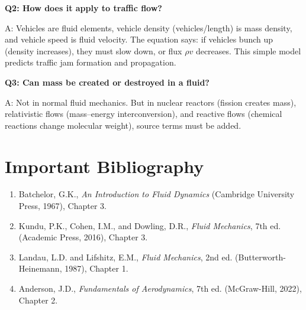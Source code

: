 \textbf{Q2: How does it apply to traffic flow?}

A: Vehicles are fluid elements, vehicle density (vehicles/length) is mass density, and vehicle speed is fluid velocity. The equation says: if vehicles bunch up (density increases), they must slow down, or flux $\rho v$ decreases. This simple model predicts traffic jam formation and propagation.

\textbf{Q3: Can mass be created or destroyed in a fluid?}

A: Not in normal fluid mechanics. But in nuclear reactors (fission creates mass), relativistic flows (mass--energy interconversion), and reactive flows (chemical reactions change molecular weight), source terms must be added.
\section*{Important Bibliography}

\begin{enumerate}
\item Batchelor, G.K., \textit{An Introduction to Fluid Dynamics} (Cambridge University Press, 1967), Chapter 3.
\item Kundu, P.K., Cohen, I.M., and Dowling, D.R., \textit{Fluid Mechanics}, 7th ed. (Academic Press, 2016), Chapter 3.
\item Landau, L.D. and Lifshitz, E.M., \textit{Fluid Mechanics}, 2nd ed. (Butterworth-Heinemann, 1987), Chapter 1.
\item Anderson, J.D., \textit{Fundamentals of Aerodynamics}, 7th ed. (McGraw-Hill, 2022), Chapter 2.
\end{enumerate}

